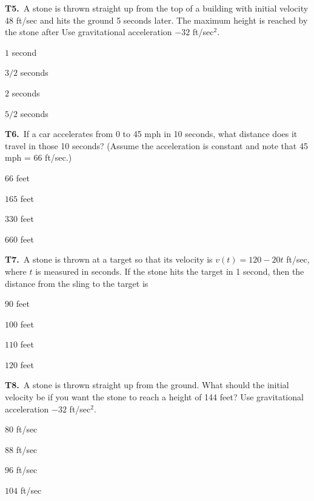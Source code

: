 \documentclass[11pt]{article}
\begin{document}
\bigskip\noindent\textbf{T5.}\ A stone is thrown straight up from the top of a building with initial velocity 48 ft/sec and hits the ground 5 seconds later. The maximum height is reached by the stone after Use gravitational acceleration $-32$ ft/sec$^2$.
\begin{list}{}{\setlength{\leftmargin}{3em}\setlength{\labelwidth}{2.5em}\setlength{\itemsep}{0pt}\setlength{\topsep}{2pt}}
\item[(A)] $1$ second
\item[(B)] $3/2$ seconds
\item[(C)] $2$ seconds
\item[(D)] $5/2$ seconds
\end{list}

\bigskip\noindent\textbf{T6.}\ If a car accelerates from 0 to 45 mph in 10 seconds, what distance does it travel in those 10 seconds? (Assume the acceleration is constant and note that 45 mph = 66 ft/sec.)
\begin{list}{}{\setlength{\leftmargin}{3em}\setlength{\labelwidth}{2.5em}\setlength{\itemsep}{0pt}\setlength{\topsep}{2pt}}
\item[(A)] $66$ feet
\item[(B)] $165$ feet
\item[(C)] $330$ feet
\item[(D)] $660$ feet
\end{list}

\bigskip\noindent\textbf{T7.}\ A stone is thrown at a target so that its velocity is $v(t)=120-20t$ ft/sec, where $t$ is measured in seconds. If the stone hits the target in 1 second, then the distance from the sling to the target is
\begin{list}{}{\setlength{\leftmargin}{3em}\setlength{\labelwidth}{2.5em}\setlength{\itemsep}{0pt}\setlength{\topsep}{2pt}}
\item[(A)] $90$ feet
\item[(B)] $100$ feet
\item[(C)] $110$ feet
\item[(D)] $120$ feet
\end{list}

\bigskip\noindent\textbf{T8.}\ A stone is thrown straight up from the ground. What should the initial velocity be if you want the stone to reach a height of 144 feet? Use gravitational acceleration $-32$ ft/sec$^2$.
\begin{list}{}{\setlength{\leftmargin}{3em}\setlength{\labelwidth}{2.5em}\setlength{\itemsep}{0pt}\setlength{\topsep}{2pt}}
\item[(A)] $80$ ft/sec
\item[(B)] $88$ ft/sec
\item[(C)] $96$ ft/sec
\item[(D)] $104$ ft/sec
\end{list}
\end{document}
